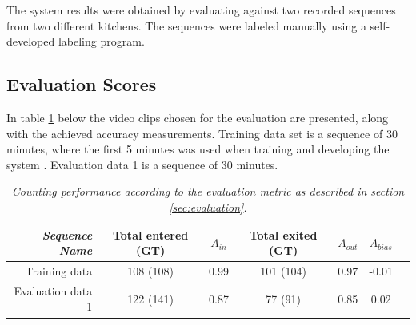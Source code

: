 The system results were obtained by evaluating against two recorded sequences from two different kitchens. The sequences were labeled manually using a self-developed labeling program.

\subsection{Evaluation Scores}
In table \ref{tab:evaluation_performance} below the video clips chosen for the evaluation are presented, along with the achieved accuracy measurements. Training data set is a sequence of 30 minutes, where the first 5 minutes was used when training and developing the system . Evaluation data 1 is a sequence of 30 minutes.

\begin{table}[h]
\centering
	\begin{tabular}{r | c | c | c | c | c | c }
		\emph{Sequence Name}		&  Total entered (GT) & \emph{$A_{in}$} & Total exited (GT) & \emph{$A_{out}$} & \emph{$A_{bias}$}\\
		\hline \hline
		Training data			& 108 (108) & 0.99 & 101 (104) & 0.97 & -0.01 \\
		Evaluation data 1		& 122 (141) & 0.87 & 77 (91) & 0.85 & 0.02 \\
		\end{tabular}
	\caption[System performance]{\textit{Counting performance according to the evaluation metric as described in section \ref{sec:evaluation}.}}
	\label{tab:evaluation_performance}
\end{table}

